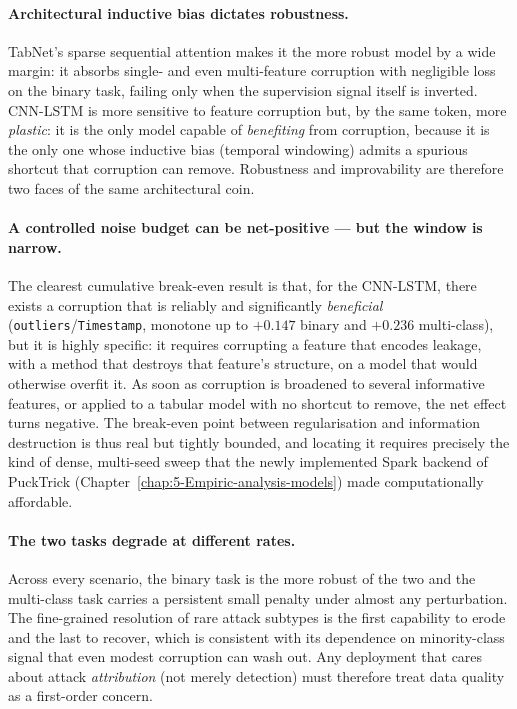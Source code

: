 \documentclass[../main.tex]{subfiles}
\begin{document}
\paragraph{Architectural inductive bias dictates robustness.}
TabNet's sparse sequential attention makes it the more robust model by a wide margin: it absorbs single- and even multi-feature corruption with negligible loss on the binary task, failing only when the supervision signal itself is inverted. CNN-LSTM is more sensitive to feature corruption but, by the same token, more \emph{plastic}: it is the only model capable of \emph{benefiting} from corruption, because it is the only one whose inductive bias (temporal windowing) admits a spurious shortcut that corruption can remove. Robustness and improvability are therefore two faces of the same architectural coin.

\paragraph{A controlled noise budget can be net-positive --- but the window is narrow.}
The clearest cumulative break-even result is that, for the CNN-LSTM, there exists a corruption that is reliably and significantly \emph{beneficial} (\texttt{outliers}/\texttt{Timestamp}, monotone up to $+0.147$ binary and $+0.236$ multi-class), but it is highly specific: it requires corrupting a feature that encodes leakage, with a method that destroys that feature's structure, on a model that would otherwise overfit it. As soon as corruption is broadened to several informative features, or applied to a tabular model with no shortcut to remove, the net effect turns negative. The break-even point between regularisation and information destruction is thus real but tightly bounded, and locating it requires precisely the kind of dense, multi-seed sweep that the newly implemented Spark backend of PuckTrick (Chapter~\ref{chap:5-Empiric-analysis-models}) made computationally affordable.

\paragraph{The two tasks degrade at different rates.}
Across every scenario, the binary task is the more robust of the two and the multi-class task carries a persistent small penalty under almost any perturbation. The fine-grained resolution of rare attack subtypes is the first capability to erode and the last to recover, which is consistent with its dependence on minority-class signal that even modest corruption can wash out. Any deployment that cares about attack \emph{attribution} (not merely detection) must therefore treat data quality as a first-order concern.
\end{document}

